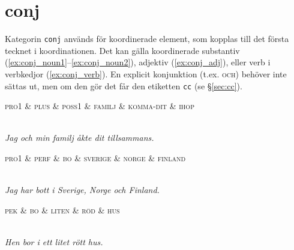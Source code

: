 \documentclass[11pt,a4paper]{article}
\begin{document}
\section{conj}
Kategorin \texttt{conj} används för koordinerade element, som kopplas till det första tecknet i koordinationen. Det kan gälla koordinerade substantiv (\ref{ex:conj_noun1}--\ref{ex:conj_noun2}), adjektiv (\ref{ex:conj_adj}), eller verb i verbkedjor (\ref{ex:conj_verb}). En explicit konjunktion (t.ex. \textsc{och}) behöver inte sättas ut, men om den gör det får den etiketten \texttt{cc} (se §\ref{sec:cc}).

\begin{example}
\label{ex:conj_noun1}
\begin{dependency}[theme = simple]
   \begin{deptext}[column sep=1em]
      \textsc{pro1} \& \textsc{plus} \& \textsc{poss1} \& \textsc{familj} \& \textsc{komma-dit} \& \textsc{ihop} \\
   \end{deptext}
\end{dependency}
\\
\textit{Jag och min familj åkte dit tillsammans.}
\end{example}

\begin{example}
\label{ex:conj_noun2}
\begin{dependency}[theme = simple]
   \begin{deptext}[column sep=1em]
      \textsc{pro1} \& \textsc{perf} \& \textsc{bo} \& \textsc{sverige} \& \textsc{norge} \& \textsc{finland} \\
   \end{deptext}
\end{dependency}
\\
\textit{Jag har bott i Sverige, Norge och Finland.}
\end{example}

\begin{example}
\label{ex:conj_adj}
\begin{dependency}[theme = simple]
   \begin{deptext}[column sep=1em]
      \textsc{pek} \& \textsc{bo} \& \textsc{liten} \& \textsc{röd} \& \textsc{hus} \\
   \end{deptext}
\end{dependency}
\\
\textit{Hen bor i ett litet rött hus.}
\end{example}
\end{document}

